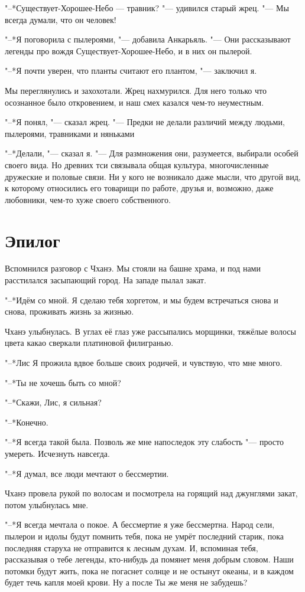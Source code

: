 \documentclass[a4paper,10pt,fleqn]{book}
\newcommand{\ldotst}{\so{...}\xspace}
\begin{document}
"--*Существует-Хорошее-Небо — травник? "--- удивился старый жрец.
"--- Мы всегда думали, что он человек!

"--*Я поговорила с пылероями, "--- добавила Анкарьяль.
"--- Они рассказывают легенды про вождя Существует-Хорошее-Небо, и в них он пылерой.

"--*Я почти уверен, что планты считают его плантом, "--- заключил я.

Мы переглянулись и захохотали.
Жрец нахмурился.
Для него только что осознанное было откровением, и наш смех казался чем-то неуместным.

"--*Я понял, "--- сказал жрец.
"--- Предки не делали различий между людьми, пылероями, травниками и няньками\ldotst

"--*Делали, "--- сказал я.
"--- Для размножения они, разумеется, выбирали особей своего вида.
Но древних тси связывала общая культура, многочисленные дружеские и половые связи.
Ни у кого не возникало даже мысли, что другой вид, к которому относились его товарищи по работе, друзья и, возможно, даже любовники, чем-то хуже своего собственного.

\section{Эпилог}

Вспомнился разговор с Чханэ.
Мы стояли на башне храма, и под нами расстилался засыпающий город.
На западе пылал закат.

"--*Идём со мной.
Я сделаю тебя хоргетом, и мы будем встречаться снова и снова, проживать жизнь за жизнью.

Чханэ улыбнулась.
В углах её глаз уже рассыпались морщинки, тяжёлые волосы цвета какао сверкали платиновой филигранью.

"--*Лис\ldotst
Я прожила вдвое больше своих родичей, и чувствую, что мне\ldotst много.

"--*Ты не хочешь быть со мной?

"--*Скажи, Лис, я сильная?

"--*Конечно.

"--*Я всегда такой была.
Позволь же мне напоследок эту слабость "--- просто умереть.
Исчезнуть навсегда.

"--*Я думал, все люди мечтают о бессмертии.

Чханэ провела рукой по волосам и посмотрела на горящий над джунглями закат, потом улыбнулась мне.

"--*Я всегда мечтала о покое.
А бессмертие\ldotst я уже бессмертна.
Народ сели, пылерои и идолы будут помнить тебя, пока не умрёт последний старик, пока последняя старуха не отправится к лесным духам.
И, вспоминая тебя, рассказывая о тебе легенды, кто-нибудь да помянет меня добрым словом.
Наши потомки будут жить, пока не погаснет солнце и не остынут океаны, и в каждом будет течь капля моей крови.
Ну а после\ldotst
Ты же меня не забудешь?
\end{document}
